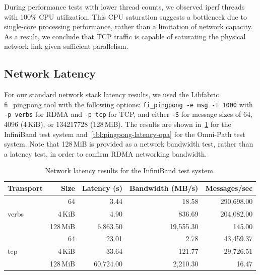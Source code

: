 During performance tests with lower thread counts, we observed iperf threads with 100\% \ac{CPU} utilization. This \ac{CPU} saturation suggests a bottleneck due to single-core processing performance, rather than a limitation of network capacity. As a result, we conclude that \ac{TCP} traffic is capable of saturating the physical network link given sufficient parallelism.

\subsection{Network Latency}

\begin{sloppypar}
For our standard network stack latency results, we used the Libfabric fi\_pingpong tool with the following options: \texttt{fi\_pingpong -e msg -I 1000} with \texttt{-p verbs} for \ac{RDMA} and \texttt{-p tcp} for \ac{TCP}, and either \texttt{-S} for message sizes of 64, 4096 (4\,KiB), or 134217728 (128\,MiB). The results are shown in~\cref{tbl:pingpong-latency} for the InfiniBand test system and~\cref{tbl:pingpong-latency-opa} for the Omni-Path test system. Note that 128\,MiB is provided as a network bandwidth test, rather than a latency test, in order to confirm \ac{RDMA} networking bandwidth.
\end{sloppypar}

\begin{table}[H]
\centering
\begin{tabular}{|lrrrr|}
\hline
\textbf{Transport} & \textbf{Size} & \textbf{Latency (\textmu{}s)} & \textbf{Bandwidth (MB/s)} & \textbf{Messages/sec} \\
\hline
\multirow{3}{*}{verbs} & 64   & 3.44  & 18.58 & 290,698.00 \\
                        & 4\,KiB   & 4.90  & 836.69 & 204,082.00 \\
                        & 128\,MiB & 6,863.50 & 19,555.30 & 145.00 \\
\multirow{3}{*}{tcp}   & 64   & 23.01  & 2.78 & 43,459.37 \\
                        & 4\,KiB   & 33.64  & 121.77 & 29,726.51 \\
                        & 128\,MiB & 60,724.00 & 2,210.30 & 16.47 \\
\hline
\end{tabular}
\caption[InfiniBand Latency Results]{Network latency results for the InfiniBand test system.}
\label{tbl:pingpong-latency}
\end{table}

